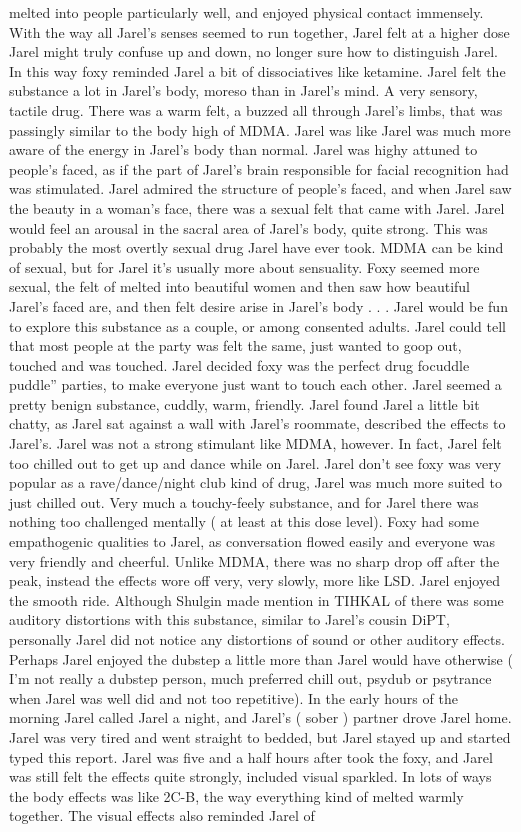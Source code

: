 \documentclass[12pt]{book}
\begin{document}
melted into people particularly well, and enjoyed physical contact immensely. With the way all Jarel's senses seemed to run together, Jarel felt at a higher dose Jarel might truly confuse up and down, no longer sure how to distinguish Jarel. In this way foxy reminded Jarel a bit of dissociatives like ketamine. Jarel felt the substance a lot in Jarel's body, moreso than in Jarel's mind. A very sensory, tactile drug. There was a warm felt, a buzzed all through Jarel's limbs, that was passingly similar to the body high of MDMA. Jarel was like Jarel was much more aware of the energy in Jarel's body than normal. Jarel was highy attuned to people's faced, as if the part of Jarel's brain responsible for facial recognition had was stimulated. Jarel admired the structure of people's faced, and when Jarel saw the beauty in a woman's face, there was a sexual felt that came with Jarel. Jarel would feel an arousal in the sacral area of Jarel's body, quite strong. This was probably the most overtly sexual drug Jarel have ever took. MDMA can be kind of sexual, but for Jarel it's usually more about sensuality. Foxy seemed more sexual, the felt of melted into beautiful women and then saw how beautiful Jarel's faced are, and then felt desire arise in Jarel's body . . .  Jarel would be fun to explore this substance as a couple, or among consented adults. Jarel could tell that most people at the party was felt the same, just wanted to goop out, touched and was touched. Jarel decided foxy was the perfect drug focuddle puddle'' parties, to make everyone just want to touch each other. Jarel seemed a pretty benign substance, cuddly, warm, friendly. Jarel found Jarel a little bit chatty, as Jarel sat against a wall with Jarel's roommate, described the effects to Jarel's. Jarel was not a strong stimulant like MDMA, however. In fact, Jarel felt too chilled out to get up and dance while on Jarel. Jarel don't see foxy was very popular as a rave/dance/night club kind of drug, Jarel was much more suited to just chilled out. Very much a touchy-feely substance, and for Jarel there was nothing too challenged mentally ( at least at this dose level). Foxy had some empathogenic qualities to Jarel, as conversation flowed easily and everyone was very friendly and cheerful. Unlike MDMA, there was no sharp drop off after the peak, instead the effects wore off very, very slowly, more like LSD. Jarel enjoyed the smooth ride. Although Shulgin made mention in TIHKAL of there was some auditory distortions with this substance, similar to Jarel's cousin DiPT, personally Jarel did not notice any distortions of sound or other auditory effects. Perhaps Jarel enjoyed the dubstep a little more than Jarel would have otherwise ( I'm not really a dubstep person, much preferred chill out, psydub or psytrance when Jarel was well did and not too repetitive). In the early hours of the morning Jarel called Jarel a night, and Jarel's ( sober ) partner drove Jarel home. Jarel was very tired and went straight to bedded, but Jarel stayed up and started typed this report. Jarel was five and a half hours after took the foxy, and Jarel was still felt the effects quite strongly, included visual sparkled. In lots of ways the body effects was like 2C-B, the way everything kind of melted warmly together. The visual effects also reminded Jarel of 
\end{document}
